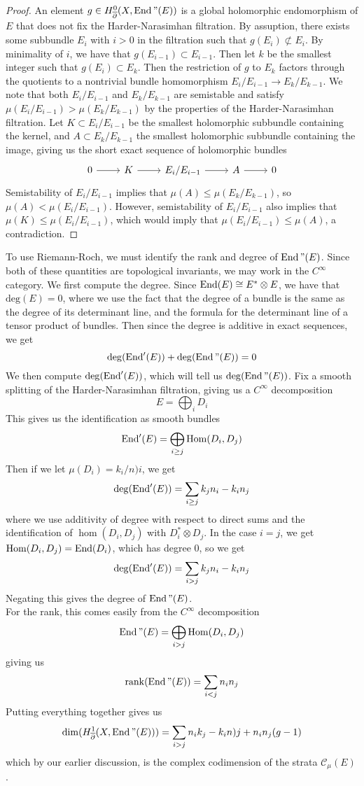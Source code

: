 \begin{proof}
An element $g \in H^0_{\overline{\partial}}(X,\operatorname{End}"(E))$ is a global holomorphic endomorphism of
$E$ that does not fix the Harder-Narasimhan filtration. By assuption,
there exists some subbundle $E_i$ with $i > 0$ in the filtration such that
$g(E_i) \not\subset E_i$. By minimality of $i$, we have that
$g(E_{i-1}) \subset E_{i-1}$. Then let $k$ be the smallest integer such
that $g(E_i) \subset E_k$. Then the restriction of $g$ to $E_k$ factors
through the quotients to a nontrivial bundle homomorphism
$E_i/E_{i-1} \to E_k/E_{k-1}$. We note that both $E_i/E_{i-1}$ and $E_k/E_{k-1}$
are semistable and satisfy $\mu(E_i/E_{i-1}) > \mu(E_k/E_{k-1})$ by the properties
of the Harder-Narasimhan filtration. Let $K \subset E_i/E_{i-1}$ be
the smallest holomorphic subbundle containing the kernel, and
$A \subset E_k/E_{k-1}$ the smallest holomorphic subbundle containing the image,
giving us the short exact sequence of holomorphic bundles
\[\begin{tikzcd}
0 \ar[r] & K \ar[r] & E_i/E_{i-1} \ar[r] & A \ar[r] & 0
\end{tikzcd}\]
Semistability of $E_i/E_{i-1}$ implies that $\mu(A) \leq \mu(E_k/E_{k-1})$,
so $\mu(A) < \mu(E_i/E_{i-1})$. However, semistability of $E_i/E_{i-1}$ also
implies that $\mu(K) \leq \mu(E_i/E_{i-1})$, which would imply that
$\mu(E_i/E_{i-1}) \leq \mu(A)$, a contradiction.
\end{proof}
%
To use Riemann-Roch, we must identify the rank and degree of $\operatorname{End}"(E)$.
Since both of these quantities are topological invariants, we may work
in the $C^\infty$ category. We first compute the degree.
Since $\operatorname{End}(E) \cong E^*\otimes E$, we have that
$\mathrm{deg}(E) = 0$, where we use the fact that the degree of a bundle
is the same as the degree of its determinant line, and the formula for
the determinant line of a tensor product of bundles. Then since the
degree is additive in exact sequences, we get
\[
\mathrm{deg}(\operatorname{End}'(E)) + \mathrm{deg}(\operatorname{End}"(E)) = 0
\]
We then compute $\mathrm{deg}(\operatorname{End}'(E))$, which will tell us $\mathrm{deg}(\operatorname{End}"(E))$.
Fix a smooth splitting of the Harder-Narasimhan filtration, giving us a
$C^\infty$ decomposition
\[
E = \bigoplus_i D_i
\]
This gives us the identification as smooth bundles
\[
\operatorname{End}'(E) = \bigoplus_{i \geq j}\mathrm{Hom}(D_i,D_j)
\]
Then if we let $\mu(D_i) = k_i/n)i$, we get
\[
\mathrm{deg}(\operatorname{End}'(E)) = \sum_{i\geq j} k_jn_i - k_in_j
\]
where we use additivity of degree with respect to direct sums and
the identification of $\hom(D_i,D_j)$ with $D_i^*\otimes D_j$. In the
case $i = j$, we get $\mathrm{Hom}(D_i,D_j) = \operatorname{End}(D_i)$, which has degree $0$,
so we get
\[
\mathrm{deg}(\operatorname{End}'(E)) = \sum_{i > j} k_jn_i - k_in_j
\]
Negating this gives the degree of $\operatorname{End}"(E)$. \\

For the rank, this comes easily from the $C^\infty$ decomposition
\[
\operatorname{End}"(E) = \bigoplus_{i > j}\mathrm{Hom}(D_i,D_j)
\]
giving us
\[
\mathrm{rank}(\operatorname{End}"(E)) = \sum_{i < j} n_in_j
\]
Putting everything together gives us
\[
\dim(H^1_{\overline{\partial}}(X,\operatorname{End}"(E))) = \sum_{i > j}n_ik_j-k_in)j + n_in_j(g-1)
\]
which by our earlier discussion, is the complex codimension of the strata
$\mathscr{C}_\mu(E)$.
%
